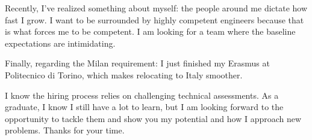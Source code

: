 \documentclass[11pt, a4paper]{awesome-cv}
\begin{document}
\begin{cvletter}
Recently, I've realized something about myself: the people around me dictate how fast I grow. I want to be surrounded by highly competent engineers because that is what forces me to be competent. I am looking for a team where the baseline expectations are intimidating.

Finally, regarding the Milan requirement: I just finished my Erasmus at Politecnico di Torino, which makes relocating to Italy smoother.

I know the hiring process relies on challenging technical assessments. As a graduate, I know I still have a lot to learn, but I am looking forward to the opportunity to tackle them and show you my potential and how I approach new problems. Thanks for your time.

\end{cvletter}


\makeletterclosing
\end{document}
